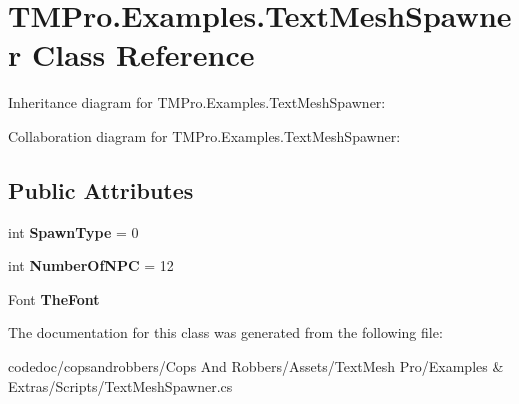 \hypertarget{classTMPro_1_1Examples_1_1TextMeshSpawner}{}\section{T\+M\+Pro.\+Examples.\+Text\+Mesh\+Spawner Class Reference}
\label{classTMPro_1_1Examples_1_1TextMeshSpawner}


Inheritance diagram for T\+M\+Pro.\+Examples.\+Text\+Mesh\+Spawner\+:


Collaboration diagram for T\+M\+Pro.\+Examples.\+Text\+Mesh\+Spawner\+:
\subsection*{Public Attributes}
\begin{DoxyCompactItemize}
\item 
\mbox{\label{classTMPro_1_1Examples_1_1TextMeshSpawner_ab194341830ee5e784c176b8b516d6fe3}} 
int {\bfseries Spawn\+Type} = 0
\item 
\mbox{\label{classTMPro_1_1Examples_1_1TextMeshSpawner_a27f2e4feca0ce34a67de071e9e256bfb}} 
int {\bfseries Number\+Of\+N\+PC} = 12
\item 
\mbox{\label{classTMPro_1_1Examples_1_1TextMeshSpawner_a5095e4cdcd5de19421b45082723ea30e}} 
Font {\bfseries The\+Font}
\end{DoxyCompactItemize}


The documentation for this class was generated from the following file\+:\begin{DoxyCompactItemize}
\item 
codedoc/copsandrobbers/\+Cops And Robbers/\+Assets/\+Text\+Mesh Pro/\+Examples \& Extras/\+Scripts/Text\+Mesh\+Spawner.\+cs\end{DoxyCompactItemize}
